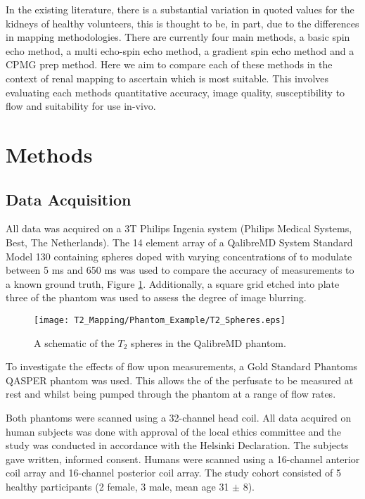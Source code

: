 In the existing literature, there is a substantial variation in quoted \ttwo values for the kidneys of healthy volunteers, this is thought to be, in part, due to the differences in \ttwo mapping methodologies. There are currently four main methods, a basic spin echo method, a multi echo-spin echo method, a gradient spin echo method and a \ac{CPMG} \ttwo prep method. Here we aim to compare each of these methods in the context of renal \ttwo mapping to ascertain which is most suitable. This involves evaluating each methods quantitative accuracy, image quality, susceptibility to flow and suitability for use in-vivo.

\section{Methods}
\label{sec:t2_methods}

\subsection{Data Acquisition}
\label{subsec:t2_acq_schemes}

All data was acquired on a 3T Philips Ingenia system (Philips Medical Systems, Best, The Netherlands). The 14 element \ttwo array of a QalibreMD System Standard Model 130 containing spheres doped with varying concentrations of  to modulate \ttwo between 5 ms and 650 ms was used to compare the accuracy of \ttwo measurements to a known ground truth, Figure \ref{fig:t2_phantom_schematic}. Additionally, a square grid etched into plate three of the phantom was used to assess the degree of image blurring. 

\begin{figure}[H]
	\centering
	\texttt{[image: T2\_Mapping/Phantom\_Example/T2\_Spheres.eps]}
	\caption{A schematic of the $T_2$ spheres in the QalibreMD phantom.}
	\label{fig:t2_phantom_schematic}	
\end{figure}

To investigate the effects of flow upon \ttwo measurements, a Gold Standard Phantoms \ac{QASPER} phantom was used. This allows the \ttwo of the perfusate to be measured at rest and whilst being pumped through the phantom at a range of flow rates. 

Both phantoms were scanned using a 32-channel head coil. All data acquired on human subjects was done with approval of the local ethics committee and the study was conducted in accordance with the Helsinki Declaration. The subjects gave written, informed consent. Humans were scanned using a 16-channel anterior coil array and 16-channel posterior coil array. The study cohort consisted of 5 healthy participants (2 female, 3 male, mean age 31 $\pm$ 8).

